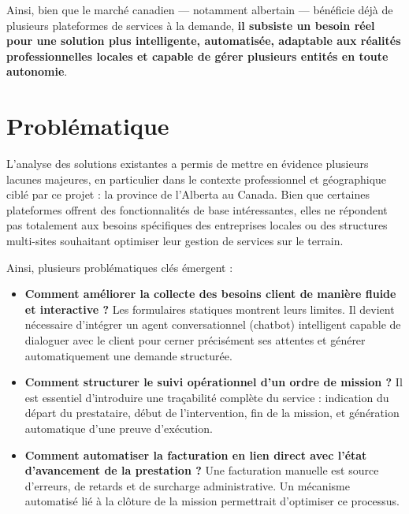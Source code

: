 \medskip

Ainsi, bien que le marché canadien — notamment albertain — bénéficie déjà de plusieurs plateformes de services à la demande, \textbf{il subsiste un besoin réel pour une solution plus intelligente, automatisée, adaptable aux réalités professionnelles locales et capable de gérer plusieurs entités en toute autonomie}.

\section{Problématique}

L’analyse des solutions existantes a permis de mettre en évidence plusieurs lacunes majeures, en particulier dans le contexte professionnel et géographique ciblé par ce projet : la province de l’Alberta au Canada. Bien que certaines plateformes offrent des fonctionnalités de base intéressantes, elles ne répondent pas totalement aux besoins spécifiques des entreprises locales ou des structures multi-sites souhaitant optimiser leur gestion de services sur le terrain.

\medskip

Ainsi, plusieurs problématiques clés émergent :

\begin{itemize}
  \item \textbf{Comment améliorer la collecte des besoins client de manière fluide et interactive ?}  
  Les formulaires statiques montrent leurs limites. Il devient nécessaire d’intégrer un agent conversationnel (chatbot) intelligent capable de dialoguer avec le client pour cerner précisément ses attentes et générer automatiquement une demande structurée.

  \item \textbf{Comment structurer le suivi opérationnel d’un ordre de mission ?}  
  Il est essentiel d’introduire une traçabilité complète du service : indication du départ du prestataire, début de l’intervention, fin de la mission, et génération automatique d’une preuve d’exécution.

  \item \textbf{Comment automatiser la facturation en lien direct avec l’état d’avancement de la prestation ?}  
  Une facturation manuelle est source d’erreurs, de retards et de surcharge administrative. Un mécanisme automatisé lié à la clôture de la mission permettrait d’optimiser ce processus.
\end{itemize}

\medskip

